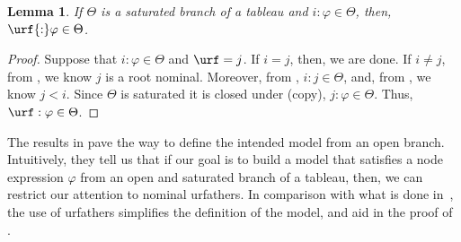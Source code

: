 \documentclass[10pt,a4paper]{amsart}
\newtheorem{lem}[thm]{Lemma}
\theoremstyle{definition}
\theoremstyle{remark}
\begin{document}


\begin{lem}\label{lemma:urfclos}
    If $\Theta$ is a saturated branch of a tableau and $i{:}\varphi \in \Theta$, then, $\urf{:}\varphi \in \Theta$.
\end{lem}
\begin{proof}
    Suppose that  $i{:}\varphi\in\Theta$ and $\urf=j$.
    If $i = j$, then, we are done.
    If $i \neq j$, from , we know $j$ is a root nominal.
    Moreover, from ,  $i{:}j \in \Theta$, and, from , we know $j < i$.
    Since $\Theta$ is saturated it is closed under (copy), $j{:}\varphi\in\Theta$.
    Thus, $\urf:\varphi \in \Theta$.
\end{proof}

The results in  pave the way to define the intended model from an open branch.
Intuitively, they tell us that if our goal is to build a model that satisfies a node expression $\varphi$ from an open and saturated branch of a tableau, then, we can restrict our attention to nominal urfathers.
In comparison with what is done in~\cite{ArecesFS17}, the use of urfathers simplifies the definition of the model, and aid in the proof of .
\end{document}
